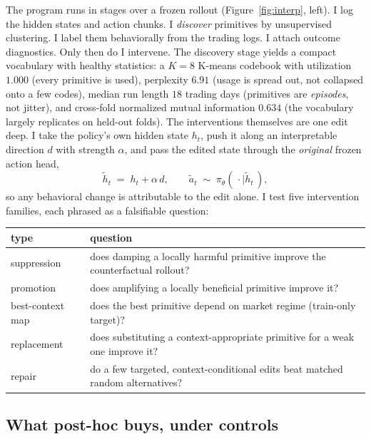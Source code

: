 \documentclass[11pt]{article}
\begin{document}
The program runs in stages over a frozen rollout (Figure~\ref{fig:interp}, left). I log the
hidden states and action chunks. I \emph{discover} primitives by unsupervised clustering. I label
them behaviorally from the trading logs. I attach outcome diagnostics. Only then do I intervene.
The discovery stage yields a compact vocabulary with healthy statistics: a $K{=}8$ K-means
codebook with utilization $1.000$ (every primitive is used), perplexity $6.91$ (usage is spread
out, not collapsed onto a few codes), median run length $18$ trading days (primitives are
\emph{episodes}, not jitter), and cross-fold normalized mutual information $0.634$ (the vocabulary
largely replicates on held-out folds). The interventions themselves are one edit deep. I take the
policy's own hidden state $h_t$, push it along an interpretable direction $d$ with strength
$\alpha$, and pass the edited state through the \emph{original} frozen action head,
\begin{equation}
\tilde h_t \;=\; h_t + \alpha\, d, \qquad
\tilde a_t \;\sim\; \pi_\theta(\,\cdot \mid \tilde h_t\,),
\label{eq:intervene}
\end{equation}
so any behavioral change is attributable to the edit alone. I test five intervention families,
each phrased as a falsifiable question:
\begin{center}\small
\begin{tabular}{lp{10.2cm}}
\toprule
type & question \\
\midrule
suppression & does damping a locally harmful primitive improve the counterfactual rollout? \\
promotion & does amplifying a locally beneficial primitive improve it? \\
best-context map & does the best primitive depend on market regime (train-only target)? \\
replacement & does substituting a context-appropriate primitive for a weak one improve it? \\
repair & do a few targeted, context-conditional edits beat matched random alternatives? \\
\bottomrule
\end{tabular}
\end{center}

\subsection{What post-hoc buys, under controls}
\label{sec:interpresults}
\end{document}
